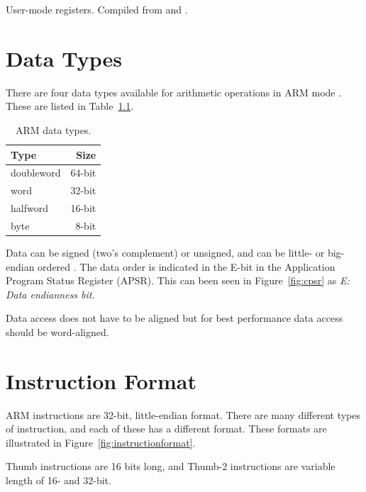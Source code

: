 \documentclass[oneside,a4paper]{report}
\begin{document}
\begin{table}[p]
	\centering
	\singlespacing
	
	\caption{User-mode registers. Compiled from \cite[p. 15]{AAPCS} and \cite[p. 14--15]{iOSABI}.}
	\label{tab:registers}
\end{table}

\chapter{Data Types}

There are four data types available for arithmetic operations in ARM mode \cite[p. 2-14]{A8Ref}. These are listed in Table~\ref{tab:datatypes}.

\begin{table}[htb]
	\centering
	\begin{tabular}{lr}
		\toprule
		Type			&		Size		\\
		\midrule
		doubleword		&		64-bit		\\
		word			& 		32-bit		\\
		halfword 		& 		16-bit		\\
		byte 			& 		8-bit		\\
		\bottomrule
	\end{tabular}
	\caption{ARM data types.}
	\label{tab:datatypes}
\end{table}

Data can be signed (two's complement) or unsigned, and can be little- or big-endian ordered \cite[p. 4-2]{A8Ref}. The data order is indicated in the E-bit in the Application Program Status Register (APSR). This can been seen in Figure~\ref{fig:cpsr} as \emph{E: Data endianness bit}.

Data access does not have to be aligned but for best performance data access should be word-aligned.

\chapter{Instruction Format}

ARM instructions are 32-bit, little-endian format. There are many different types of instruction, and each of these has a different format. These formats are illustrated in Figure~\ref{fig:instructionformat}.

Thumb instructions are 16 bits long, and Thumb-2 instructions are variable length of 16- and 32-bit.
\end{document}
